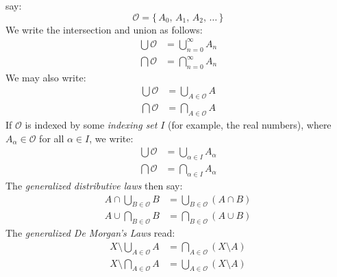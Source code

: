 \documentclass{article}
\theoremstyle{plain}
\theoremstyle{normal}
\begin{document}
        say:
        \begin{equation}
            \mathcal{O}=\{\,A_{0},\,A_{1},\,A_{2},\,\dots\,\}
        \end{equation}
        We write the intersection and union as follows:
        \begin{align}
            \bigcup\mathcal{O}&=\bigcup_{n=0}^{\infty}A_{n}\\
            \bigcap\mathcal{O}&=\bigcap_{n=0}^{\infty}A_{n}
        \end{align}
        We may also write:
        \begin{align}
            \bigcup\mathcal{O}&=\bigcup_{A\in\mathcal{O}}A\\
            \bigcap\mathcal{O}&=\bigcap_{A\in\mathcal{O}}A
        \end{align}
        If $\mathcal{O}$ is indexed by some \textit{indexing set} $I$
        (for example, the real numbers), where $A_{\alpha}\in\mathcal{O}$
        for all $\alpha\in{I}$, we write:
        \begin{align}
            \bigcup\mathcal{O}&=\bigcup_{\alpha\in{I}}A_{\alpha}\\
            \bigcap\mathcal{O}&=\bigcap_{\alpha\in{I}}A_{\alpha}
        \end{align}
        The \textit{generalized distributive laws} then say:
        \begin{align}
            A\cap\bigcup_{B\in\mathcal{O}}B
                &=\bigcup_{B\in\mathcal{O}}(A\cap{B})\\
            A\cup\bigcap_{B\in\mathcal{O}}B
                &=\bigcap_{B\in\mathcal{O}}(A\cup{B})
        \end{align}
        The \textit{generalized De Morgan's Laws} read:
        \begin{align}
            X\setminus\bigcup_{A\in\mathcal{O}}A
                &=\bigcap_{A\in\mathcal{O}}(X\setminus{A})\\
            X\setminus\bigcap_{A\in\mathcal{O}}A
                &=\bigcup_{A\in\mathcal{O}}(X\setminus{A})
        \end{align}
\end{document}
